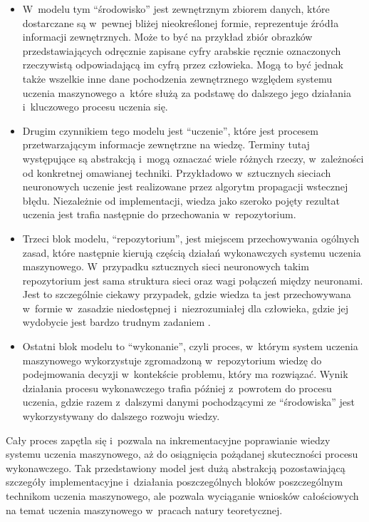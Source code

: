 {\begin{itemize}

  \item W~modelu tym ``środowisko'' jest zewnętrznym zbiorem danych, które dostarczane są w~pewnej bliżej nieokreślonej formie, reprezentuje źródła informacji zewnętrznych.
        Może to być na przykład zbiór obrazków przedstawiających odręcznie zapisane cyfry arabskie ręcznie oznaczonych rzeczywistą odpowiadającą im cyfrą przez człowieka.
        Mogą to być jednak także wszelkie inne dane pochodzenia zewnętrznego względem systemu uczenia maszynowego a~które służą za podstawę do dalszego jego działania i~kluczowego procesu uczenia się.


  \item Drugim czynnikiem tego modelu jest ``uczenie'', które jest procesem przetwarzającym informacje zewnętrzne na wiedzę.
        Terminy tutaj występujące są abstrakcją i~mogą oznaczać wiele różnych rzeczy, w~zależności od konkretnej omawianej techniki.
        Przykładowo w~sztucznych sieciach neuronowych uczenie jest realizowane przez algorytm propagacji wstecznej błędu.
        Niezależnie od implementacji, wiedza jako szeroko pojęty rezultat uczenia jest trafia następnie do przechowania w~repozytorium.

  \item Trzeci blok modelu, ``repozytorium'', jest miejscem przechowywania ogólnych zasad, które następnie kierują częścią działań wykonawczych systemu uczenia maszynowego.
        W~przypadku sztucznych sieci neuronowych takim repozytorium jest sama struktura sieci oraz wagi połączeń między neuronami.
        Jest to szczególnie ciekawy przypadek, gdzie wiedza ta jest przechowywana w~formie w~zasadzie niedostępnej i~niezrozumiałej dla człowieka, gdzie jej wydobycie jest bardzo trudnym zadaniem \cite{boger1997knowledge}.

  \item Ostatni blok modelu to ``wykonanie'', czyli proces, w~którym system uczenia maszynowego wykorzystuje zgromadzoną w~repozytorium wiedzę do podejmowania decyzji w~kontekście problemu, który ma rozwiązać.
        Wynik działania procesu wykonawczego trafia później z~powrotem do procesu uczenia, gdzie razem z~dalszymi danymi pochodzącymi ze ``środowiska'' jest wykorzystywany do dalszego rozwoju wiedzy.

\end{itemize}

Cały proces zapętla się i~pozwala na inkrementacyjne poprawianie wiedzy systemu uczenia maszynowego, aż do osiągnięcia pożądanej skuteczności procesu wykonawczego.
Tak przedstawiony model jest dużą abstrakcją pozostawiającą szczegóły implementacyjne i~działania poszczególnych bloków poszczególnym technikom uczenia maszynowego, ale pozwala wyciąganie wniosków całościowych na temat uczenia maszynowego w~pracach natury teoretycznej.

}

